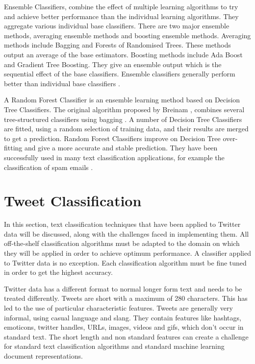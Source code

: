 Ensemble Classifiers, combine the effect of multiple learning algorithms to try and achieve better performance than the individual learning algorithms. They aggregate various individual base classifiers. There are two major ensemble methods, averaging ensemble methods and boosting ensemble methods. Averaging methods include Bagging and Forests of Randomised Trees. These methods output an average of the base estimators. Boosting methods include Ada Boost and Gradient Tree Boosting. They give an ensemble output which is the sequential effect of the base classifiers. Ensemble classifiers generally perform better than individual base classifiers \cite{Opitz1999}. 

A Random Forest Classifier is an ensemble learning method based on Decision Tree Classifiers. The original algorithm proposed by Breinam \cite{Breiman2001}, combines several tree-structured classifiers using bagging \cite{breiman1996bagging}. A number of Decision Tree Classifiers are fitted, using a random selection of training data, and their results are merged to get a prediction. Random Forest Classifiers improve on Decision Tree over-fitting and give a more accurate and stable prediction. They have been successfully used in many text classification applications, for example the classification of spam emails \cite{akinyelu2014}.


\section{Tweet Classification}

In this section, text classification techniques that have been applied to Twitter data will be discussed, along with the challenges faced in implementing them. All off-the-shelf classification algorithms must be adapted to the domain on which they will be applied in order to achieve optimum performance. A classifier applied to Twitter data is no exception. Each classification algorithm must be fine tuned in order to get the highest accuracy. 

Twitter data has a different format to normal longer form text and needs to be treated differently. Tweets are short with a maximum of 280 characters. This has led to the use of particular characteristic features. Tweets are generally very informal, using casual language and slang. They contain features like hashtags, emoticons, twitter handles, URLs, images, videos and gifs, which don't occur in standard text. The short length and non standard features can create a challenge for standard text classification algorithms and standard machine learning document representations. 

